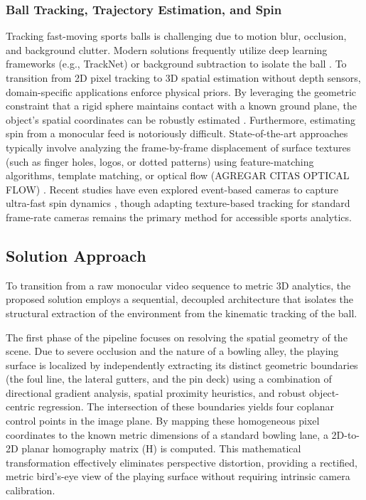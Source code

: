 \subsubsection{Ball Tracking, Trajectory Estimation, and Spin}
Tracking fast-moving sports balls is challenging due to motion blur, occlusion, and background clutter. Modern solutions frequently utilize deep learning frameworks (e.g., TrackNet) or background subtraction to isolate the ball \cite{huang2019tracknetdeeplearningnetwork}. To transition from 2D pixel tracking to 3D spatial estimation without depth sensors, domain-specific applications enforce physical priors. By leveraging the geometric constraint that a rigid sphere maintains contact with a known ground plane, the object's spatial coordinates can be robustly estimated \cite{6115930}. 
Furthermore, estimating spin from a monocular feed is notoriously difficult. State-of-the-art approaches typically involve analyzing the frame-by-frame displacement of surface textures (such as finger holes, logos, or dotted patterns) using feature-matching algorithms, template matching, or optical flow \cite{gossard2024tabletennisballspin} (AGREGAR CITAS OPTICAL FLOW)
. Recent studies have even explored event-based cameras to capture ultra-fast spin dynamics \cite{10678117}, though adapting texture-based tracking for standard frame-rate cameras remains the primary method for accessible sports analytics.





\subsection{Solution Approach}
To transition from a raw monocular video sequence to metric 3D analytics, the proposed solution employs a sequential, decoupled architecture that isolates the structural extraction of the environment from the kinematic tracking of the ball.

The first phase of the pipeline focuses on resolving the spatial geometry of the scene. Due to severe occlusion and the nature of a bowling alley, the playing surface is localized by independently extracting its distinct geometric boundaries (the foul line, the lateral gutters, and the pin deck) using a combination of directional gradient analysis, spatial proximity heuristics, and robust object-centric regression. The intersection of these boundaries yields four coplanar control points in the image plane. By mapping these homogeneous pixel coordinates to the known metric dimensions of a standard bowling lane, a 2D-to-2D planar homography matrix (H) is computed. This mathematical transformation effectively eliminates perspective distortion, providing a rectified, metric bird's-eye view of the playing surface without requiring intrinsic camera calibration.

